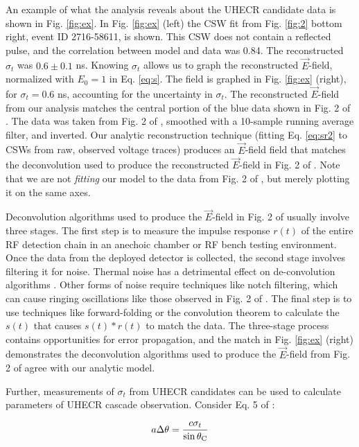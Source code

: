 \documentclass[amsmath,amssymb,aps,prd,10pt,twocolumn,showkeys]{revtex4}
\begin{document}
An example of what the analysis reveals about the UHECR candidate data is shown in Fig. \ref{fig:ex}.  In Fig. \ref{fig:ex} (left) the CSW fit from Fig. \ref{fig:2} bottom right, event ID 2716-58611, is shown.  This CSW does not contain a reflected pulse, and the correlation between model and data was 0.84.  The reconstructed $\sigma_t$ was $0.6 \pm 0.1$ ns.  Knowing $\sigma_t$ allows us to graph the reconstructed $\vec{E}$-field, normalized with $E_0=1$ in Eq. \ref{eq:s}.  The field is graphed in Fig. \ref{fig:ex} (right), for $\sigma_t = 0.6$ ns, accounting for the uncertainty in $\sigma_t$.  The reconstructed $\vec{E}$-field from our analysis matches the central portion of the blue data shown in Fig. 2 of \cite{xwqy-yzrk}.  The data was taken from Fig. 2 of \cite{xwqy-yzrk}, smoothed with a 10-sample running average filter, and inverted.  Our analytic reconstruction technique (fitting Eq. \ref{eq:sr2} to CSWs from raw, observed voltage traces) produces an $\vec{E}$-field field that matches the deconvolution used to produce the reconstructed $\vec{E}$-field in Fig. 2 of \cite{xwqy-yzrk}.  Note that we are not \textit{fitting} our model to the data from Fig. 2 of \cite{xwqy-yzrk}, but merely plotting it on the same axes.

Deconvolution algorithms used to produce the $\vec{E}$-field in Fig. 2 of \cite{xwqy-yzrk} usually involve three stages.  The first step is to measure the impulse response $r(t)$ of the entire RF detection chain in an anechoic chamber or RF bench testing environment.  Once the data from the deployed detector is collected, the second stage involves filtering it for noise.  Thermal noise has a detrimental effect on de-convolution algorithms \cite{jansson2012deconvolution}.  Other forms of noise require techniques like notch filtering, which can cause ringing oscillations like those observed in Fig. 2 of \cite{xwqy-yzrk}.  The final step is to use techniques like forward-folding or the convolution theorem to calculate the $s(t)$ that causes $s(t) * r(t)$ to match the data.  The three-stage process  contains opportunities for error propagation, and the match in Fig. \ref{fig:ex} (right) demonstrates the deconvolution algorithms used to produce the $\vec{E}$-field from Fig. 2 of \cite{xwqy-yzrk} agree with our analytic model.

Further, measurements of $\sigma_t$ from UHECR candidates can be used to calculate parameters of UHECR cascade observation.  Consider Eq. 5 of \cite{hanson2026complex-a31}:

\begin{equation}
a\Delta\theta = \frac{c \sigma_t}{\sin\theta_{\rm C}} \label{eq:uncert}
\end{equation}
\end{document}
